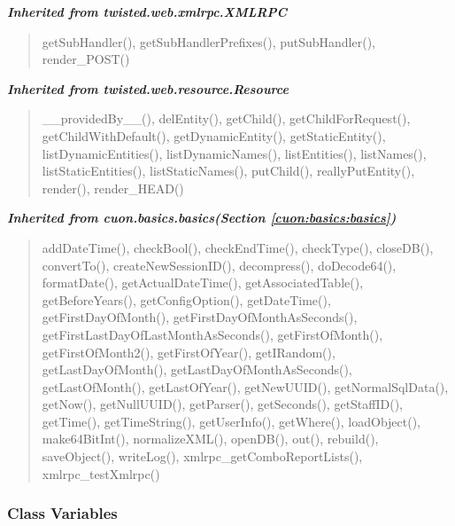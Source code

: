 \large{\textbf{\textit{Inherited from twisted.web.xmlrpc.XMLRPC}}}

\begin{quote}
getSubHandler(), getSubHandlerPrefixes(), putSubHandler(), render\_POST()
\end{quote}

\large{\textbf{\textit{Inherited from twisted.web.resource.Resource}}}

\begin{quote}
\_\_providedBy\_\_(), delEntity(), getChild(), getChildForRequest(), getChildWithDefault(), getDynamicEntity(), getStaticEntity(), listDynamicEntities(), listDynamicNames(), listEntities(), listNames(), listStaticEntities(), listStaticNames(), putChild(), reallyPutEntity(), render(), render\_HEAD()
\end{quote}

\large{\textbf{\textit{Inherited from cuon.basics.basics\textit{(Section \ref{cuon:basics:basics})}}}}

\begin{quote}
addDateTime(), checkBool(), checkEndTime(), checkType(), closeDB(), convertTo(), createNewSessionID(), decompress(), doDecode64(), formatDate(), getActualDateTime(), getAssociatedTable(), getBeforeYears(), getConfigOption(), getDateTime(), getFirstDayOfMonth(), getFirstDayOfMonthAsSeconds(), getFirstLastDayOfLastMonthAsSeconds(), getFirstOfMonth(), getFirstOfMonth2(), getFirstOfYear(), getIRandom(), getLastDayOfMonth(), getLastDayOfMonthAsSeconds(), getLastOfMonth(), getLastOfYear(), getNewUUID(), getNormalSqlData(), getNow(), getNullUUID(), getParser(), getSeconds(), getStaffID(), getTime(), getTimeString(), getUserInfo(), getWhere(), loadObject(), make64BitInt(), normalizeXML(), openDB(), out(), rebuild(), saveObject(), writeLog(), xmlrpc\_getComboReportLists(), xmlrpc\_testXmlrpc()
\end{quote}


  \subsubsection{Class Variables}

